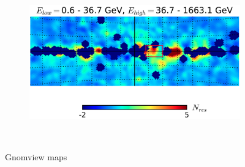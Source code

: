 \documentclass[a4paper]{article}
\begin{document}
\begin{figure}[H]
{\begin{subfigure}[b]{.5\textwidth}
	\end{subfigure}%
	\begin{subfigure}[b]{.5\textwidth}
		\centering
		\includegraphics[width=.95\textwidth]{FitE_gnomview_at_0-36_to_36-1663_4deg}
	\end{subfigure}%
	}\\
\caption{Gnomview maps}
\label{Fit_IC_pi0_to_ROI}
\end{figure}
\end{document}
